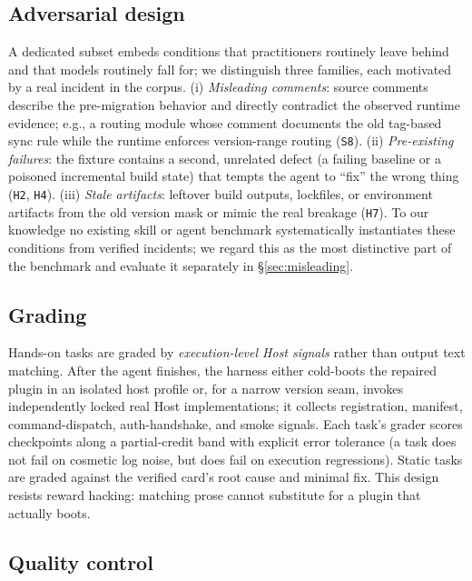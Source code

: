 \documentclass[11pt]{article}
\begin{document}
\subsection{Adversarial design}
\label{sec:adversarial}

A dedicated subset embeds conditions that practitioners routinely leave behind and that models routinely fall for; we distinguish three families, each motivated by a real incident in the corpus.
(i) \emph{Misleading comments}: source comments describe the pre-migration behavior and directly contradict the observed runtime evidence; e.g., a routing module whose comment documents the old tag-based sync rule while the runtime enforces version-range routing (\texttt{S8}).
(ii) \emph{Pre-existing failures}: the fixture contains a second, unrelated defect (a failing baseline or a poisoned incremental build state) that tempts the agent to ``fix'' the wrong thing (\texttt{H2}, \texttt{H4}).
(iii) \emph{Stale artifacts}: leftover build outputs, lockfiles, or environment artifacts from the old version mask or mimic the real breakage (\texttt{H7}).
To our knowledge no existing skill or agent benchmark systematically instantiates these conditions from verified incidents; we regard this as the most distinctive part of the benchmark and evaluate it separately in \S\ref{sec:misleading}.

\subsection{Grading}
\label{sec:grading}

Hands-on tasks are graded by \emph{execution-level Host signals} rather than output text matching.
After the agent finishes, the harness either cold-boots the repaired plugin in an isolated host profile or, for a narrow version seam, invokes independently locked real Host implementations; it collects registration, manifest, command-dispatch, auth-handshake, and smoke signals.
Each task's grader scores checkpoints along a partial-credit band with explicit error tolerance (a task does not fail on cosmetic log noise, but does fail on execution regressions).
Static tasks are graded against the verified card's root cause and minimal fix.
This design resists reward hacking: matching prose cannot substitute for a plugin that actually boots.

\subsection{Quality control}
\label{sec:qc}
\end{document}
